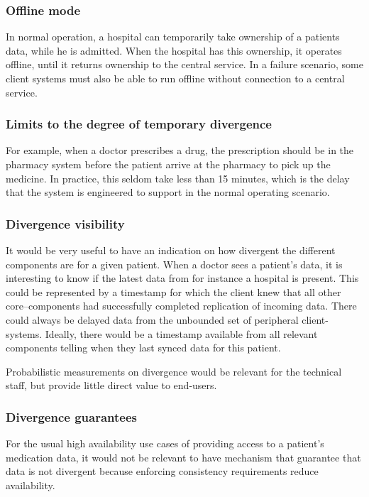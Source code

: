 \documentclass[11pt,a4paper]{report}
\begin{document}
\subsubsection{Offline mode}
In normal operation, a hospital can temporarily take ownership of a patients data, while he is admitted. When the hospital has this ownership, it operates offline, until it returns ownership to the central service.
In a failure scenario, some client systems must also be able to run offline without connection to a central service.

\subsubsection{Limits to the degree of temporary divergence}
For example, when a doctor prescribes a drug, the prescription should be in the pharmacy system before the patient arrive at the pharmacy to pick up the medicine. In practice, this seldom take less than 15 minutes, which is the delay that the system is engineered to support in the normal operating scenario.

\subsubsection{Divergence visibility}
It would be very useful to have an indication on how divergent the different components are for a given patient. When a doctor sees a patient's data, it is interesting to know if the latest data from for instance a hospital is present.
This could be represented by a timestamp for which the client knew that all other core--components had successfully completed replication of incoming data. 
There could always be delayed data from the unbounded set of peripheral client-systems. Ideally, there would be a timestamp available from all relevant components telling when they last synced data for this patient.

Probabilistic measurements on divergence would be relevant for the technical staff, but provide little direct value to end-users.

\subsubsection{Divergence guarantees}
For the usual high availability use cases of providing access to a patient's medication data, it would not be relevant to have mechanism that guarantee that data is not divergent because enforcing consistency requirements reduce availability.
\end{document}
